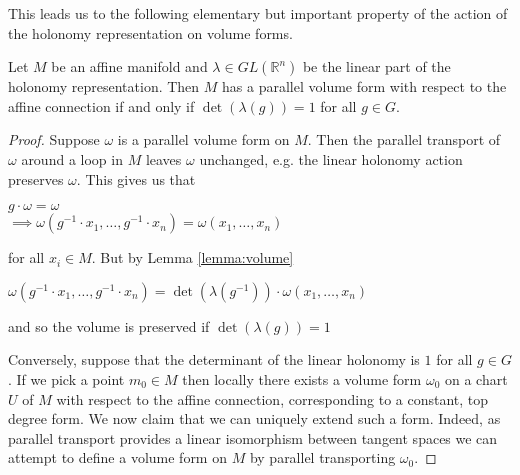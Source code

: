 This leads us to the following elementary but important property of the action
of the holonomy representation on volume forms.

\begin{corollary}
    Let $M$ be an affine manifold and $\lambda \in GL(\mathbb{R}^n)$ be the linear part of the holonomy
    representation. Then $M$ has a parallel volume form with respect to the affine connection if
    and only if $\det(\lambda(g)) = 1$ for all $g \in G$.
\end{corollary}

\begin{proof}
    Suppose $\omega$ is a parallel volume form on $M$. Then the parallel transport of $\omega$ around a loop in $M$
    leaves $\omega$ unchanged, e.g. the linear holonomy action preserves $\omega$. This gives us that
    \begin{center}
        $g\cdot \omega = \omega$\\
        $\implies \omega(g^{-1}\cdot x_1, \dots, g^{-1}\cdot x_n) = \omega(x_1, \dots, x_n)$\\
    \end{center}
    for all $x_i \in M$. But by Lemma \ref{lemma:volume}
    \begin{center}
        $\omega(g^{-1}\cdot x_1, \dots, g^{-1}\cdot x_n) = \det(\lambda(g^{-1}))\cdot \omega(x_1, \dots, x_n)$
    \end{center}
    and so the volume is preserved if $\det(\lambda(g)) = 1$

    Conversely, suppose that the determinant of the linear holonomy is $1$ for all
    $g \in G$. If we pick a point $m_0 \in M$ then locally there exists a volume
    form $\omega_0$ on a chart $U$ of $M$ with respect to the affine connection,
    corresponding to a constant, top degree form. We now claim that we can uniquely
    extend such a form. Indeed, as parallel transport provides a linear isomorphism
    between tangent spaces we can attempt to define a volume form on $M$ by
    parallel transporting $\omega_0$.


\end{proof}
